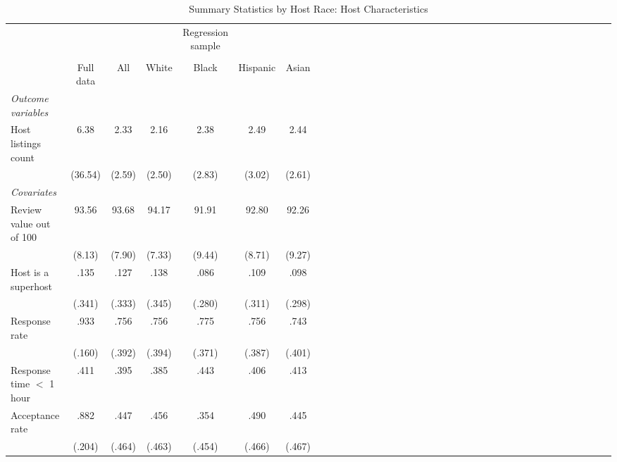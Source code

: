 {
	\begin{longtable}{l*{6}{c|c|cccc}}
		\caption{Summary Statistics by Host Race: Host Characteristics}\\
		
		\hline
		&\multicolumn{1}{c}{}&\multicolumn{1}{c}{}&\multicolumn{1}{c}{}&\multicolumn{1}{c}{Regression sample}&\multicolumn{1}{c}{}&\multicolumn{1}{c}{}\\
		\cline{3-7}\\
			&\multicolumn{1}{c}{Full data}&\multicolumn{1}{c}{All}&\multicolumn{1}{c}{White}&\multicolumn{1}{c}{Black}&\multicolumn{1}{c}{Hispanic}&\multicolumn{1}{c}{Asian}\\
		\hline\hline           
		     
		\textit{Outcome variables} \\
		
		Host listings count         & 6.38 &     2.33  &      2.16&      2.38 &    2.49  & 2.44 \\
		& (36.54)	&     (2.59)         &     (2.50)         &     (2.83)         &     (3.02) & 	(2.61)         \\
		
		\textit{Covariates} \\

		\hline
		Review value out of 100      & 93.56  &      93.68	&      94.17	 	&      91.91		&    92.80	 & 		92.26\\
		              &   (8.13)   &     (7.90)         &     (7.33)         &     (9.44)         &     (8.71) 	&	 (9.27)         \\
		
		Host is a superhost    & .135   &      .127		&      .138 &      .086 &      .109 	& 	.098\\
		&(.341) & (.333)     &     (.345)         &     (.280)         &     (.311)         &     (.298)         \\

		Response rate      & .933  &       .756		&       .756		&      .775         &      .756  	& 	.743\\
		& (.160) &     (.392)         &     (.394)         &     (.371)         &     (.387)         &		(.401)\\

		Response time $<$ 1 hour      & .411  &       .395		&       .385		&      .443         &      .406  	& 	.413\\
		[1em]
		Acceptance rate      & .882    &      .447&      .456&       .354         &      .490    &	.445     \\
		&(.204) &     (.464)         &     (.463)         &     (.454)         &     (.466)         &		(.467)\\


\end{longtable}}
